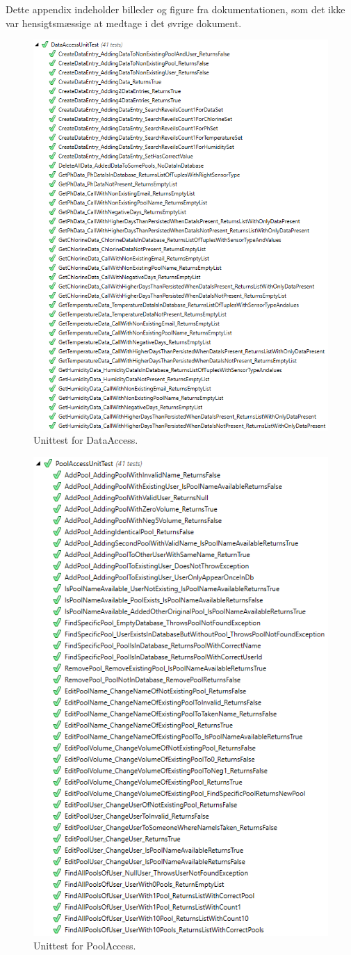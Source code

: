 Dette appendix indeholder billeder og figure fra dokumentationen, som det ikke var hensigtsmæssige at medtage i det øvrige dokument.

\begin{figure}[H]
\centering
\includegraphics[width=0.7\linewidth]{figs/test/dataaccessunittest_appendix.png}
\caption{Unittest for DataAccess.}
\label{fig:dataaccessunittest_appendix}
\end{figure}

\begin{figure}[H]
\centering
\includegraphics[width=0.7\linewidth]{figs/test/poolaccessunittest_appendix.png}
\caption{Unittest for PoolAccess.}
\label{fig:poolaccessunittest_appendix}
\end{figure}


